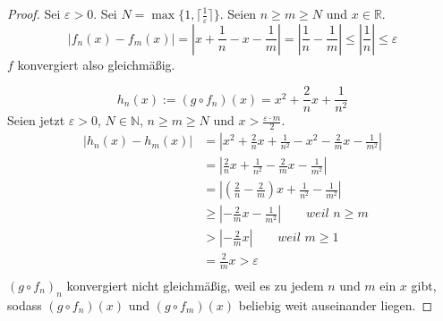 \documentclass[10pt,a4paper]{article}
\begin{document}
\begin{proof}
Sei $\varepsilon > 0$.
Sei $N = \max \{ 1, \lceil \frac{1}{\varepsilon} \rceil \}$.
Seien $n \ge m \ge N$ und $x \in \mathbb{R}$.
\begin{equation}
|f_{n}(x) - f_{m}(x)| = |x + \frac{1}{n} - x - \frac{1}{m}| = |\frac{1}{n} - \frac{1}{m}| \le |\frac{1}{n}| \le \varepsilon
\end{equation}
$f$ konvergiert also gleichmäßig.

\begin{equation}
h_{n}(x) := (g \circ f_{n})(x) = x^{2} + \frac{2}{n}x + \frac{1}{n^{2}}
\end{equation}
Seien jetzt $\varepsilon > 0$, $N \in \mathbb{N}$, $n \ge m \ge N$ und $x > \frac{\varepsilon \cdot m}{2}$.
\begin{align*}
|h_{n}(x) - h_{m}(x)| & = |x^{2} + \frac{2}{n}x + \frac{1}{n^{2}} - x^{2} - \frac{2}{m}x - \frac{1}{m^{2}}|\\
& = |\frac{2}{n}x + \frac{1}{n^{2}} - \frac{2}{m}x - \frac{1}{m^{2}}|\\
& = |(\frac{2}{n} - \frac{2}{m})x + \frac{1}{n^{2}} - \frac{1}{m^{2}}|\\
& \ge |-\frac{2}{m}x - \frac{1}{m^{2}}| \qquad \textit{weil $n \ge m$}\\
& > |-\frac{2}{m}x| \qquad \textit{weil $m \ge 1$}\\
& = \frac{2}{m}x > \varepsilon\\
\end{align*}
$(g \circ f_{n})_{n}$ konvergiert nicht gleichmäßig, weil es zu jedem $n$ und $m$ ein $x$ gibt, sodass $(g \circ f_{n})(x)$ und $(g \circ f_{m})(x)$ beliebig weit auseinander liegen.
\end{proof}
\end{document}
